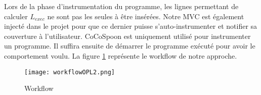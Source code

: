 Lors de la phase d'instrumentation du programme, les lignes permettant de calculer $L_{exec}$ ne sont pas les seules à être insérées. Notre MVC est également injecté dans le projet pour que ce dernier puisse s'auto-instrumenter et notifier sa couverture à l'utilisateur. CoCoSpoon est uniquement utilisé pour instrumenter un programme. Il suffira ensuite de démarrer le programme exécuté pour avoir le comportement voulu. La figure \ref{workflow} représente le workflow de notre approche. 

\begin{figure}[h]
\centering
\texttt{[image: workflowOPL2.png]}

\caption{Workflow}
\label{workflow}
\end{figure}


